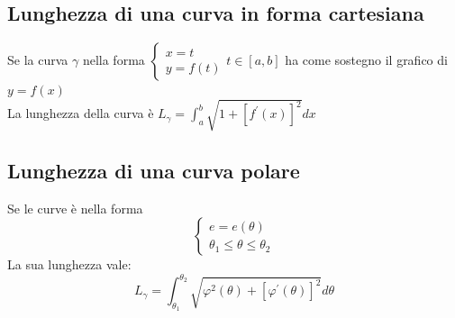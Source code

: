 \subsection{Lunghezza di una curva in forma cartesiana}
Se la curva $\gamma$ nella forma $\begin{cases}
	x=t\\
	y=f(t)
\end{cases} t\in [a,b]$ ha come sostegno il grafico di $y=f(x)$\\
La lunghezza della curva è $L_\gamma=\int_{a}^{b}\sqrt{1+[f^\prime(x)]^2}dx$
\subsection{Lunghezza di una curva polare}
Se le curve è nella forma 
\begin{equation*}
	\begin{cases}
		e=e(\theta)\\
		\theta_1\leq\theta\leq\theta_2
	\end{cases} 
\end{equation*}
La sua lunghezza vale: 
\begin{equation*}
	L_\gamma
	=\int_{\theta_1}^{\theta_2}\sqrt{\varphi^2(\theta)+[\varphi^\prime(\theta)]^2}
	d\theta
\end{equation*}

